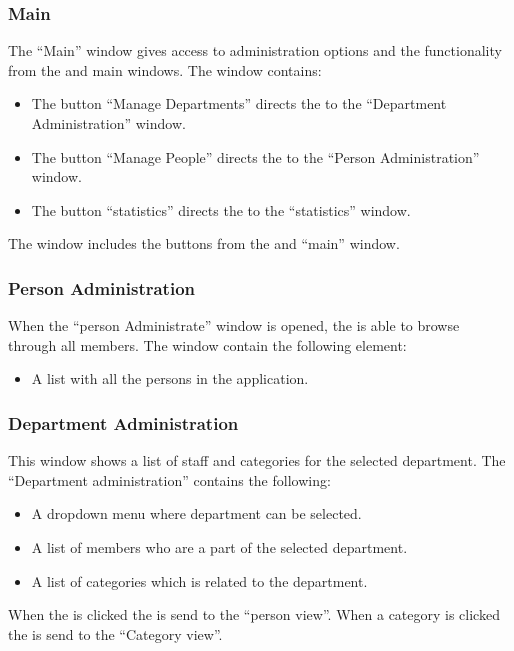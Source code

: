 \subsubsection{Main}
The ``Main'' \admin[] window gives access to administration options and the functionality from the \astaff[] and \aclient[] main windows. The window contains: 
\begin{itemize}
	\item The button ``Manage Departments'' directs the \admin[] to the ``Department Administration'' window.  
	\item The button ``Manage People'' directs the \admin[] to the ``Person Administration'' window.
	\item The button ``statistics'' directs the \admin[] to the ``statistics'' window.
\end{itemize}
The window includes the buttons from the \astaff[] and \aclient[] ``main'' window.

\subsubsection{Person Administration}
When the ``person Administrate'' window is opened, the \admin[] is able to browse through all \astaff[] members. The window contain the following element:
\begin{itemize}
	\item A list with all the persons in the application.
\end{itemize}

\subsubsection{Department Administration}
This window shows a list of staff and categories for the selected department.
The ``Department administration'' contains the following:
\begin{itemize}
	\item A dropdown menu where department can be selected.
	\item A list of \astaff[] members who are a part of the selected department.
	\item A list of categories which is related to the department.
\end{itemize}
When the \astaff[] is clicked the \admin[] is send to the ``person view''.
When a category is clicked the \admin[] is send to the ``Category view''. 


